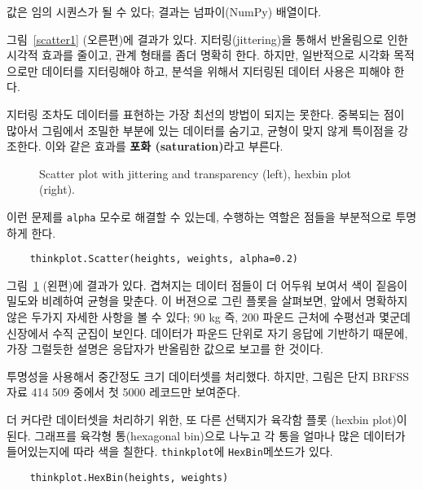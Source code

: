값은 임의 시퀀스가 될 수 있다; 결과는 넘파이(NumPy) 배열이다.

그림~\ref{scatter1} (오른편)에 결과가 있다.
지터링(jittering)을 통해서 반올림으로 인한 시각적 효과를 줄이고,
관계 형태를 좀더 명확히 한다. 하지만, 일반적으로 시각화 목적으로만
데이터를 지터링해야 하고, 분석을 위해서 지터링된 데이터 사용은 피해야 한다.

지터링 조차도 데이터를 표현하는 가장 최선의 방법이 되지는 못한다.
중복되는 점이 많아서 그림에서 조밀한 부분에 있는 데이터를 숨기고,
균형이 맞지 않게 특이점을 강조한다. 이와 같은 효과를 {\bf 포화 (saturation)}라고 부른다.

\begin{figure}
\caption{Scatter plot with jittering and transparency (left),
hexbin plot (right).}
\label{scatter2}
\end{figure}

이런 문제를 {\tt alpha} 모수로 해결할 수 있는데, 수행하는 역할은 점들을 부분적으로 투명하게 한다.

%
\begin{verbatim}
    thinkplot.Scatter(heights, weights, alpha=0.2)
\end{verbatim}
%

그림~\ref{scatter2} (왼편)에 결과가 있다.
겹쳐지는 데이터 점들이 더 어두워 보여서 색이 짙음이 밀도와 비례하여 균형을 맞춘다. 이 버젼으로 그린 플롯을 살펴보면, 앞에서 명확하지 않은 두가지 자세한 사항을 볼 수 있다; 90 kg 즉, 200 파운드 근처에 수평선과 몇군데 신장에서 수직 군집이 보인다. 데이터가 파운드 단위로 자기 응답에 기반하기 때문에, 가장 그럴듯한 설명은 응답자가 반올림한 값으로 보고를 한 것이다.


투명성을 사용해서 중간정도 크기 데이터셋를 처리했다.
하지만, 그림은 단지 BRFSS 자료 414 509 중에서 첫 5000 레코드만 보여준다.


더 커다란 데이터셋을 처리하기 위한,
또 다른 선택지가 육각함 플롯 (hexbin plot)이 된다.
그래프를 육각형 통(hexagonal bin)으로 나누고 각 통을 얼마나 많은 데이터가 들어있는지에 따라 색을 칠한다. {\tt thinkplot}에 {\tt HexBin}메쏘드가 있다.
%
\begin{verbatim}
    thinkplot.HexBin(heights, weights)
\end{verbatim}
%

